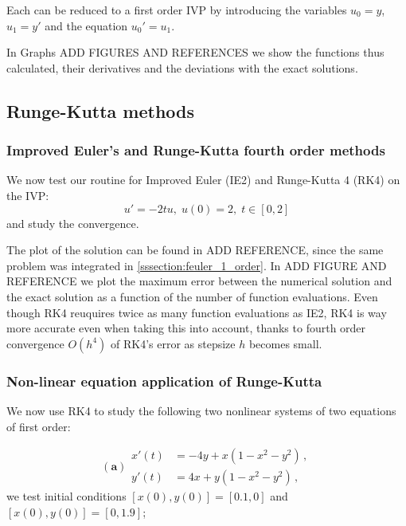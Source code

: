 \documentclass[a4paper,11]{article}
\begin{document}
Each can be reduced to a first order IVP by introducing the variables
$u_{0}=y$, $u_{1}=y'$ and the equation $u_{0}'=u_{1}$.

In Graphs ADD FIGURES AND REFERENCES we show the functions thus calculated, 
their derivatives and the deviations with the exact solutions.

\subsection{Runge-Kutta methods}

\subsubsection{Improved Euler's and Runge-Kutta fourth order methods}

We now test our routine for Improved Euler (IE2) and Runge-Kutta 4 (RK4) on
the IVP:
\[
   u' = -2t u, \; u(0) = 2, \; t\in [0,2] %
\]
and study the convergence.

The plot of the solution can be found in ADD REFERENCE, since the same
problem was integrated in \ref{sssection:feuler_1_order}.
In ADD FIGURE AND REFERENCE we plot the maximum error between the numerical
solution and the exact solution as a function of the number of function 
evaluations. Even though RK4 reuquires twice as many function evaluations as
IE2, RK4 is way more accurate even when taking this into account, thanks to 
fourth order convergence $O(h^{4})$ of RK4's error as stepsize $h$ becomes 
small.

\subsubsection{Non-linear equation application of Runge-Kutta}


We now use RK4 to study the following two nonlinear systems of two equations
of first order:

\begin{equation}\label{eq:rk4_nonlinear1}
    \mathbf{(a)} \begin{split}
      x'(t) & = - 4y + x(1-x^2-y^2)\,,\\[2.5mm]
      y'(t) & = 4x + y(1-x^2-y^2)\,,
    \end{split}
\end{equation}
we test initial conditions $[x(0),y(0)]=[0.1,0]$ and $[x(0),y(0)]=[0,1.9]$;
\end{document}
